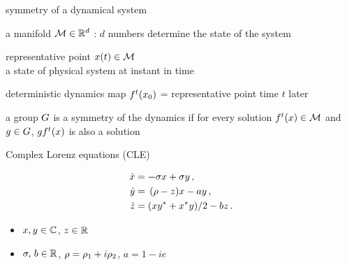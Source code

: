 \begin{frame}{symmetry of a dynamical system}

\begin{block}{\statesp}
a manifold ${\cal M} \in \mathbb{R}^{d}$ :
$d$ numbers determine the state of the system
\end{block}

\bigskip

\begin{block}{representative point }
$x(t) \in {\cal M}$
\\
a state of physical system at instant in time
\end{block}


\begin{block}{deterministic dynamics}
map ${f^t}({x_0})$ =
representative point time $t$ later
\end{block}
\begin{block}{a group $G$ is a {symmetry} of the dynamics if}
for every solution $f^t(x) \in {\cal M}$ and  $g \in G$,
$g f^t(x)$ is also a solution
\end{block}
\end{frame}


\begin{frame}{Complex Lorenz equations (CLE)}
  \begin{exampleblock}{}
	\begin{align*}
	  \dot{x} &= -\sigma x+ \sigma y \,,\nonumber \\ 
	  \dot{y} &=\, (\rho-z)x-a y\,, \nonumber \\ 
	  \dot{z} &= (x y^*+x^*y)/2 -b z\,.
	\end{align*}
  \end{exampleblock}
  \begin{block}{}
     \begin{itemize}
	  \item $x,y\in\mathbb{C}^{}$, $z\in\mathbb{R}^{}$
	  \item $\sigma,\,b \in \mathbb{R}^{}$, $\rho=\rho_1+i\rho_2$, $a=1-i e$
	  \end{itemize}
  \end{block}
\end{frame}


